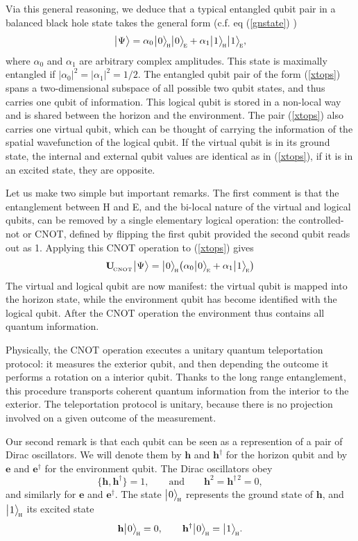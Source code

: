 \documentclass[aps,prd,twocolumn,nofootinbib,superscriptaddress,amssymb]{revtex4}
\def\be{\begin{equation}}
\def\ee{\end{equation}}
\begin{document}
Via this general reasoning, we deduce that a typical entangled qubit pair in a balanced black hole state takes 
the general form  (c.f. eq (\ref{gnstate}) )
\be \label{xtops}
 \li \Psi\ra =  \alpha_0\spc %
\li 0 \ra_{\! \Hh} \li 0 \ra_{\!\Ee} + \alpha_1\spc %
\nspc \li 1 \ra_{\! \Hh} \li 1 \ra_{\! \Ee},
\ee
where  $\alpha_{0}$  and $\alpha_1$ are arbitrary complex amplitudes. 
This state is maximally entangled if $|\alpha_{0}|^2  = |\alpha_1|^2 = 1/2$.
The entangled qubit pair of the form (\ref{xtops}) spans a two-dimensional subspace of all possible two qubit states, and thus carries one qubit of information. This logical qubit is stored in a non-local way and is shared between the horizon and the environment. The pair (\ref{xtops}) also carries one virtual qubit, which can be thought of carrying the information of
the spatial wavefunction of the logical qubit. If the virtual qubit is in its ground state, the internal and external qubit values are identical as in (\ref{xtops}), 
if it is in an excited state, they are opposite.

Let us make two simple but important remarks. The first comment is 
that the entanglement between H and E, and the bi-local nature of the virtual and logical qubits, can be removed by a single elementary logical operation: the controlled-not or CNOT, defined by flipping the first qubit provided the second qubit reads out as 1. Applying this CNOT operation to (\ref{xtops}) gives 
\be
\label{CNOT}
{\bf U}_{{\! }_{\rm CNOT}} \li \Psi\ra
= \li 0\ra_{\! \Hh}  \bigl( \alpha_0 \li 0 \ra _{\! \Ee} + \alpha_1\li1 \ra_{\! \Ee}\bigr)
\ee
The virtual and logical qubit are now manifest: the virtual qubit is mapped into the horizon state, while the environment qubit has become identified with the logical qubit. After the CNOT operation the environment thus contains all quantum information. 

Physically, the CNOT operation executes a unitary quantum teleportation protocol: it measures the exterior qubit, and then depending the outcome  it performs a 
rotation on a interior qubit. Thanks to the long range entanglement, this procedure transports coherent
quantum information from the interior to the exterior. The teleportation protocol is unitary, 
because there is no projection involved on a given  outcome of the measurement.

Our second remark is that each qubit can be seen as a represention of a pair of Dirac oscillators. We will denote them by $\mathbf{h}$ and $\mathbf{h}^\dagger$ for the horizon qubit and by $\mathbf{e}$ and $\mathbf{e}^\dagger$ for the environment qubit. The Dirac oscillators obey 
\be
\{\mathbf{h},\mathbf{h}^\dagger\}=1,\qquad \mbox{and}\qquad \mathbf{h}^2= \mathbf{h}^{\dagger\,2}=0,
\ee 
and similarly for $\mathbf{e}$ and $\mathbf{e}^\dagger$. 
The state $\bigl|\hspace{.5pt} 0 \bigr\rangle_{\! {\mbox{\scriptsize \hspace{.5pt}\sc h}}} $ represents the ground state of $\mathbf{h}$, and $\bigl|\hspace{.5pt} 1 \bigr\rangle_{\! {\mbox{\scriptsize \hspace{.5pt}\sc h}}}$ its excited state
\be
\mathbf{h} \li 0 \ra_{\! \Hh} = 0, \qquad \mathbf{h}^\dagger \li 0 \ra_{\! \Hh} = \li 1 \ra_{\! \Hh}.
\ee 
\end{document}
